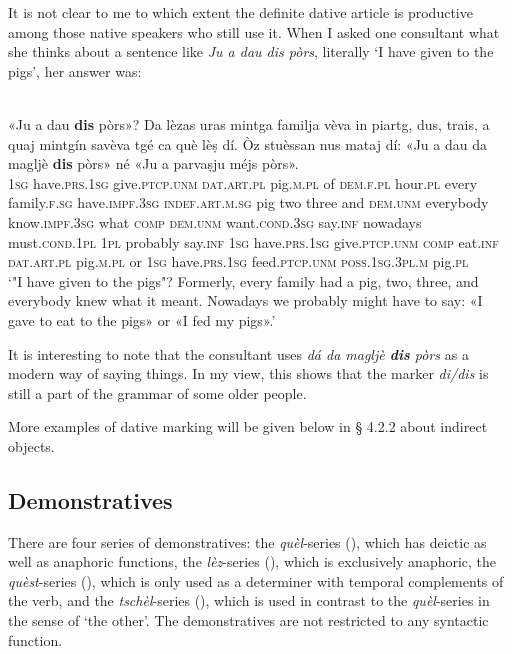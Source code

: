 It is not clear to me to which extent the definite dative article is productive among those native speakers who still use it. When I asked one consultant what she thinks about a sentence like \textit{Ju a dau dis pòrs}, literally `I have given to the pigs', her answer was:

\ea\label{datart11}
\\
\gll «Ju a dau \textbf{dis} pòrs»? Da lèzas uras mintga familja vèva in piartg, dus, trais, a quaj mintgín savèva tgé ca què lèṣ dí. Òz stuèssan nus mataj dí: «Ju a dau da magljè \textbf{dis} pòrs» né «Ju a parvaṣju méjs pòrs». \\
\textsc{1sg} have.\textsc{prs.1sg} give.\textsc{ptcp.unm} \textsc{dat.art.pl} pig.\textsc{m.pl} of \textsc{dem.f.pl} hour.\textsc{pl} every family.\textsc{f.sg} have.\textsc{impf.3sg} \textsc{indef.art.m.sg} pig two three and  \textsc{dem.unm} everybody know.\textsc{impf.3sg} what \textsc{comp}  \textsc{dem.unm} want.\textsc{cond.3sg} say.\textsc{inf} nowadays must.\textsc{cond.1pl} \textsc{1pl} probably  say.\textsc{inf} \textsc{1sg} have.\textsc{prs.1sg} give.\textsc{ptcp.unm}  \textsc{comp} eat.\textsc{inf} \textsc{dat.art.pl} pig.\textsc{m.pl} or  \textsc{1sg} have.\textsc{prs.1sg} feed.\textsc{ptcp.unm} \textsc{poss.1sg.3pl.m} pig.\textsc{pl}\\
\glt `"I have given to the pigs"? Formerly, every family had a pig, two, three, and everybody knew what it meant. Nowadays we probably might have to say: «I gave to eat to the pigs» or «I fed my pigs».'
\z

It is interesting to note that the consultant uses \textit{dá da magljè \textbf{dis} pòrs} as a modern way of saying things. In my view, this shows that the marker \textit{di/dis} is still a part of the grammar of some older people.

More examples of dative marking will be given below in § 4.2.2 about indirect objects.

\subsection{Demonstratives}
There are four series of demonstratives: the \textit{quèl}-series (), which has deictic as well as anaphoric functions, the \textit{lèz}-series ({}), which is exclusively anaphoric, the \textit{quèst}-series ({}), which is only used as a determiner with temporal complements of the verb, and the \textit{tschèl}-series  ({}), which is used in contrast to the \textit{quèl}-series in the sense of `the other'. The demonstratives are not restricted to any syntactic function.

